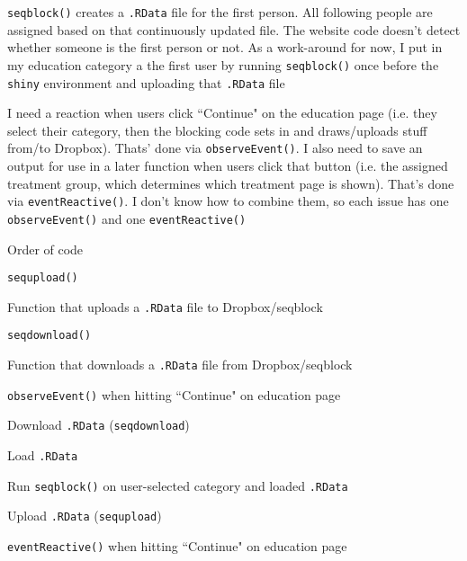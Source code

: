 \begin{coi}
\begin{coi}
				\item \texttt{seqblock()} creates a \texttt{.RData} file for the first person. All following people are assigned based on that continuously updated file. The website code doesn't detect whether someone is the first person or not. As a work-around for now, I put in my education category a the first user by running \texttt{seqblock()} once before the \texttt{shiny} environment and uploading that \texttt{.RData} file
				\item I need a reaction when users click ``Continue" on the education page (i.e. they select their category, then the blocking code sets in and draws/uploads stuff from/to Dropbox). Thats' done via \texttt{observeEvent()}. I also need to save an output for use in a later function when users click that button (i.e. the assigned treatment group, which determines which treatment page is shown). That's done via \texttt{eventReactive()}. I don't know how to combine them, so each issue has one \texttt{observeEvent()} and one \texttt{eventReactive()}
				\item Order of code
					\begin{coi}
						\item \texttt{sequpload()}
							\begin{coi}
								\item Function that uploads a \texttt{.RData} file to Dropbox/seqblock
							\end{coi}
						\item \texttt{seqdownload()}
							\begin{coi}
								\item Function that downloads a \texttt{.RData} file from Dropbox/seqblock
							\end{coi}
						\item \texttt{observeEvent()} when hitting ``Continue" on education page
							\begin{coi}
								\item Download \texttt{.RData} (\texttt{seqdownload})
								\item Load \texttt{.RData}
								\item Run \texttt{seqblock()} on user-selected category and loaded \texttt{.RData}
								\item Upload \texttt{.RData} (\texttt{sequpload})
							\end{coi}
						\item \texttt{eventReactive()} when hitting ``Continue" on education page
							\begin{coi}

\end{coi}
\end{coi}
\end{coi}
\end{coi}
